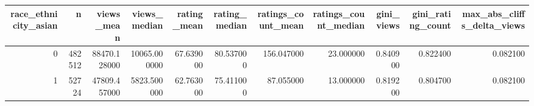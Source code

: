 \begin{tabular}{rrrrrrrrrrr}
\toprule
race_ethnicity_asian & n & views_mean & views_median & rating_mean & rating_median & ratings_count_mean & ratings_count_median & gini_views & gini_rating_count & max_abs_cliffs_delta_views \\
\midrule
0 & 482512 & 88470.128000 & 10065.000000 & 67.639000 & 80.537000 & 156.047000 & 23.000000 & 0.840900 & 0.822400 & 0.082100 \\
1 & 52724 & 47809.457000 & 5823.500000 & 62.763000 & 75.411000 & 87.055000 & 13.000000 & 0.819200 & 0.804700 & 0.082100 \\
\bottomrule
\end{tabular}
